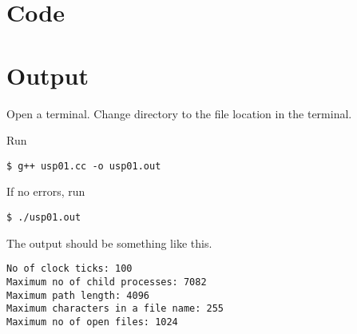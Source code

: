\section{Code}



\section{Output}

Open a terminal. Change directory to the file location in the terminal.

Run
\begin{lstlisting}[style=shell-command]
$ g++ usp01.cc -o usp01.out
\end{lstlisting}

If no errors, run
\begin{lstlisting}[style=shell-command]
$ ./usp01.out
\end{lstlisting}

The output should be something like this.
\begin{lstlisting}[style=shell-output]
No of clock ticks: 100
Maximum no of child processes: 7082
Maximum path length: 4096
Maximum characters in a file name: 255
Maximum no of open files: 1024
\end{lstlisting}

